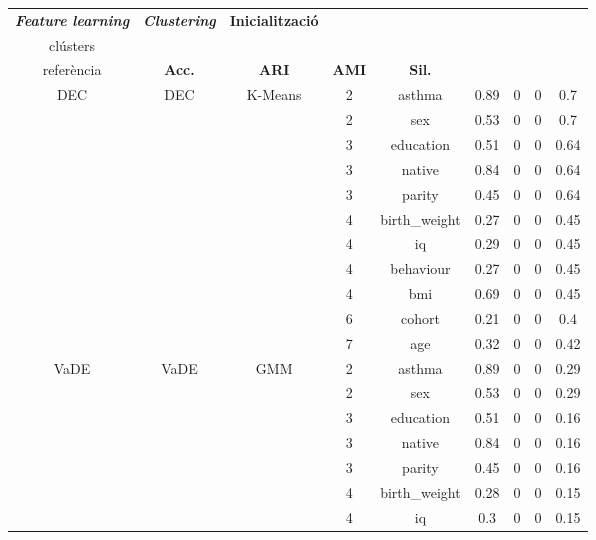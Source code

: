 \documentclass[CAT,BIB]{TFUOC}%
\begin{document}
    \newpage
    \scriptsize
    \begin{center}
        \begin{longtable}{@{}ccccccccc@{}}
            \toprule
            \textit{\textbf{Feature learning}} & \textit{\textbf{Clustering}} & \textbf{Inicialització} & \textbf{\begin{tabular}[c]{@{}l@{}}Núm.\\ clústers\end{tabular}} & \textbf{\begin{tabular}[c]{@{}l@{}}Covariable\\ referència\end{tabular}} & \textbf{Acc.} & \textbf{ARI} & \textbf{AMI} & \textbf{Sil.} \\ \hline
            \multirow{11}{*}{DEC} & \multirow{11}{*}{DEC} & \multirow{11}{*}{K-Means} & 2 & asthma & 0.89 & 0 & 0 & 0.7 \\
            &  &  & 2 & sex & 0.53 & 0 & 0 & 0.7 \\
            &  &  & 3 & education & 0.51 & 0 & 0 & 0.64 \\
            &  &  & 3 & native & 0.84 & 0 & 0 & 0.64 \\
            &  &  & 3 & parity & 0.45 & 0 & 0 & 0.64 \\
            &  &  & 4 & birth\_weight & 0.27 & 0 & 0 & 0.45 \\
            &  &  & 4 & iq & 0.29 & 0 & 0 & 0.45 \\
            &  &  & 4 & behaviour & 0.27 & 0 & 0 & 0.45 \\
            &  &  & 4 & bmi & 0.69 & 0 & 0 & 0.45 \\
            &  &  & 6 & cohort & 0.21 & 0 & 0 & 0.4 \\
            &  &  & 7 & age & 0.32 & 0 & 0 & 0.42 \\ \midrule
            \multirow{11}{*}{VaDE} & \multirow{11}{*}{VaDE} & \multirow{11}{*}{GMM} & 2 & asthma & 0.89 & 0 & 0 & 0.29 \\
            &  &  & 2 & sex & 0.53 & 0 & 0 & 0.29 \\
            &  &  & 3 & education & 0.51 & 0 & 0 & 0.16 \\
            &  &  & 3 & native & 0.84 & 0 & 0 & 0.16 \\
            &  &  & 3 & parity & 0.45 & 0 & 0 & 0.16 \\
            &  &  & 4 & birth\_weight & 0.28 & 0 & 0 & 0.15 \\
            &  &  & 4 & iq & 0.3 & 0 & 0 & 0.15 \\

\end{longtable}
\end{center}
\end{document}
